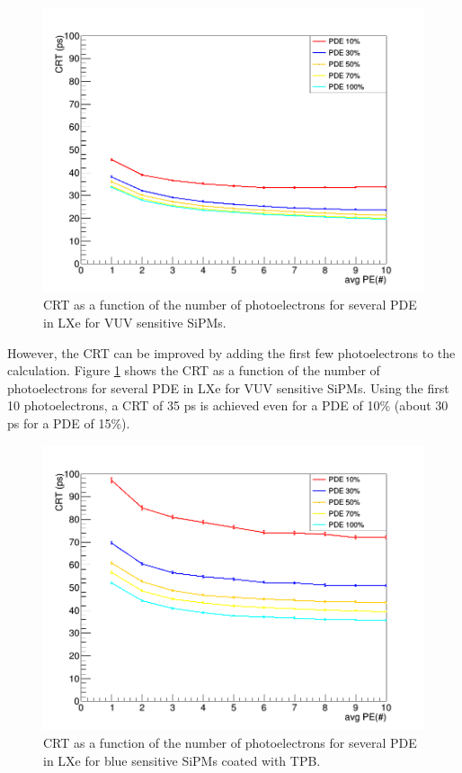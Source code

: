 \documentclass[review]{elsarticle}
\begin{document}
{\begin{figure}[!bhtp]
	\centering
	\includegraphics[scale=3]{../img/lxe_noCher_avg_npe.png}
	\caption{\label{fig.crt4} CRT as a function of the number of photoelectrons for several PDE in LXe for VUV sensitive SiPMs.}
\end{figure}

However, the CRT can be improved by adding the first few photoelectrons to the calculation. 
Figure \ref{fig.crt4} shows the CRT as a function of the number of photoelectrons for several PDE in LXe for VUV sensitive SiPMs. Using the first 10 photoelectrons, a CRT of 35 ps is achieved even for a PDE of 10\% (about 30 ps for a PDE of 15\%). 

\begin{figure}[!bhtp]
	\centering
	\includegraphics[scale=3]{../img/lxe_tpb_noCher_avg_npe.png}
	\caption{\label{fig.crt5} CRT as a function of the number of photoelectrons for several PDE in LXe for blue sensitive SiPMs coated with TPB.}
\end{figure}

}
\end{document}
